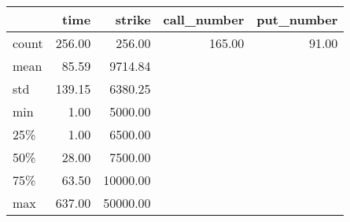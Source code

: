 \begin{tabular}{lrrrr}
\toprule
{} &   time &   strike &  call\_number &  put\_number \\
\midrule
count & 256.00 &   256.00 &       165.00 &       91.00 \\
mean  &  85.59 &  9714.84 &              &             \\
std   & 139.15 &  6380.25 &              &             \\
min   &   1.00 &  5000.00 &              &             \\
25\%   &   1.00 &  6500.00 &              &             \\
50\%   &  28.00 &  7500.00 &              &             \\
75\%   &  63.50 & 10000.00 &              &             \\
max   & 637.00 & 50000.00 &              &             \\
\bottomrule
\end{tabular}
